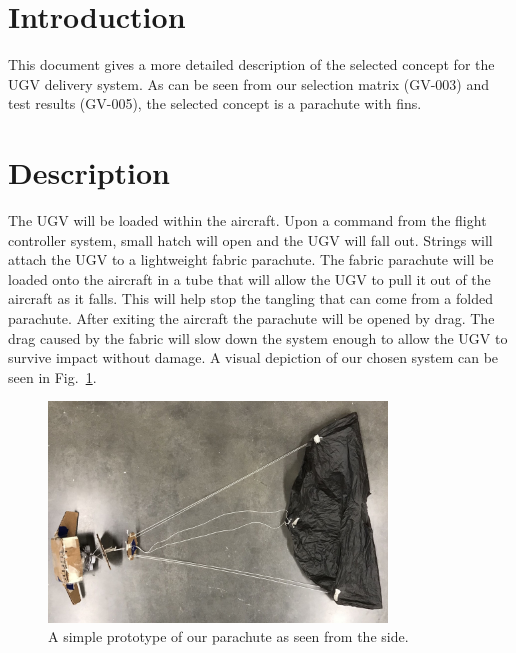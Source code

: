 \documentclass[]{auvsi_doc}
\begin{document}
\begin{AUVSITitlePage}
\begin{artifacttable}
\end{artifacttable}
\end{AUVSITitlePage}

\section{Introduction}
This document gives a more detailed description of the selected concept for the UGV delivery system. As can be seen from our selection matrix (GV-003) and test results (GV-005), the selected concept is a parachute with fins.

\section{Description}

The UGV will be loaded within the aircraft. Upon a command from the flight controller system, small hatch will open and the UGV will fall out. Strings will attach the UGV to a lightweight fabric parachute. The fabric parachute will be loaded onto the aircraft in a tube that will allow the UGV to pull it out of the aircraft as it falls. This will help stop the tangling that can come from a folded parachute. After exiting the aircraft the parachute will be opened by drag. The drag caused by the fabric will slow down the system enough to allow the UGV to survive impact without damage. A visual depiction of our chosen system can be seen in Fig.~\ref{fig:side}.

\begin{figure}[h]
\centering
\includegraphics[width=90mm]{./figs/Parachute_Side.jpg}
\caption{A simple prototype of our parachute as seen from the side.}
\label{fig:side}
\end{figure}
\end{document}
